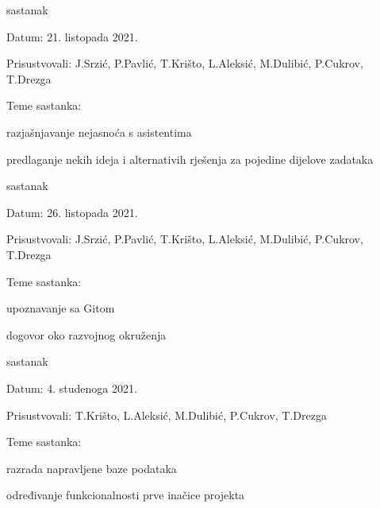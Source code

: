 \begin{packed_enum}
			\item  sastanak
			\item[] \begin{packed_item}
				\item Datum: 21. listopada 2021.
				\item Prisustvovali: J.Srzić, P.Pavlić, T.Krišto, L.Aleksić, M.Dulibić, P.Cukrov, T.Drezga
				\item Teme sastanka:
				\begin{packed_item}
					\item  razjašnjavanje nejasnoća s asistentima
					\item  predlaganje nekih ideja i alternativih rješenja za pojedine dijelove zadataka
				\end{packed_item}
			\end{packed_item}
			
			\item  sastanak
			\item[] \begin{packed_item}
				\item Datum: 26. listopada 2021.
				\item Prisustvovali: J.Srzić, P.Pavlić, T.Krišto, L.Aleksić, M.Dulibić, P.Cukrov, T.Drezga
				\item Teme sastanka:
				\begin{packed_item}
					\item  upoznavanje sa Gitom
					\item  dogovor oko razvojnog okruženja
				\end{packed_item}
			\end{packed_item}
			
			\item  sastanak
			\item[] \begin{packed_item}
				\item Datum: 4. studenoga 2021.
				\item Prisustvovali: T.Krišto, L.Aleksić, M.Dulibić, P.Cukrov, T.Drezga
				\item Teme sastanka:
				\begin{packed_item}
					\item  razrada napravljene baze podataka
					\item  određivanje funkcionalnosti prve inačice projekta
				\end{packed_item}
			\end{packed_item}
			

\end{packed_enum}
